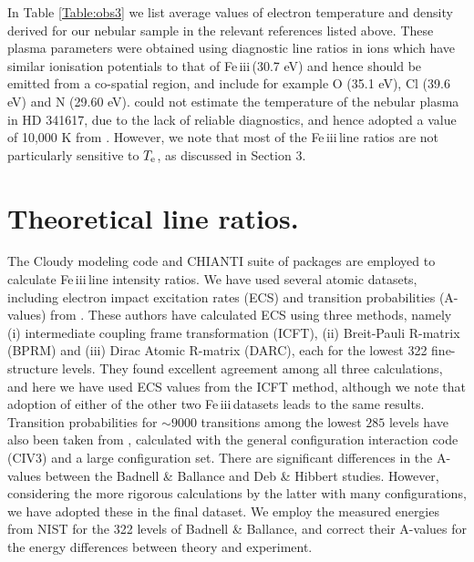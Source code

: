 \documentclass{emulateapj}
\newcommand\fe{Fe\,{\sc iii}\,}
\begin{document}
In Table \ref{Table:obs3} we list average values of electron temperature and density derived for our nebular sample
in the relevant references listed above. These plasma parameters were obtained using diagnostic line ratios in ions which have
similar ionisation potentials to that of \fe (30.7 eV) and hence should be emitted from a co-spatial region, and include
for example O {} (35.1 eV), Cl {} (39.6 eV) and N {} (29.60 eV). 
\citet{2003A&A...401.1119R} could not estimate the temperature of the nebular plasma in HD 341617, due to the 
lack of reliable diagnostics, and hence adopted a value of 10,000 K from \citet{2000A&A...357..241P}. However, we note that most of the \fe line ratios are not particularly sensitive to $T_{\rm e}$, as discussed in Section 3. 



\section{Theoretical line ratios.}\label{section:theory}

The Cloudy modeling code \citep{1998PASP..110..761F,2013RMxAA..49..137F} and CHIANTI suite of packages \citep{1997A&AS..125..149D,2015A&A...582A..56D} are employed to calculate \fe line intensity ratios. We have used several atomic datasets, including 
electron impact excitation rates (ECS) and transition probabilities (A-values) from \citet{2014ApJ...785...99B}. 
{These authors have calculated ECS using three methods, namely (i) intermediate coupling frame transformation (ICFT), (ii) 
Breit-Pauli R-matrix (BPRM) and (iii) Dirac Atomic R-matrix (DARC), each for the lowest 322 fine-structure levels. They found excellent agreement among all three calculations, and here we have used ECS values from the ICFT method, although we note that adoption of either of the other two \fe datasets leads to the same results.} 
Transition probabilities for $\sim 9000$ transitions among the lowest $285$ levels have also been taken 
from \citet{2009ADNDT..95..184D}, calculated with the 
general configuration interaction code (CIV3) and a large configuration set. There are significant differences in the A-values between the Badnell \& Ballance and Deb \& Hibbert studies. However, considering the more rigorous calculations by the latter 
with many configurations, we have adopted these in the final dataset. We employ the measured energies from NIST
for the 322 levels of Badnell \& Ballance, and correct their A-values for the energy differences between theory and experiment. 
\end{document}
